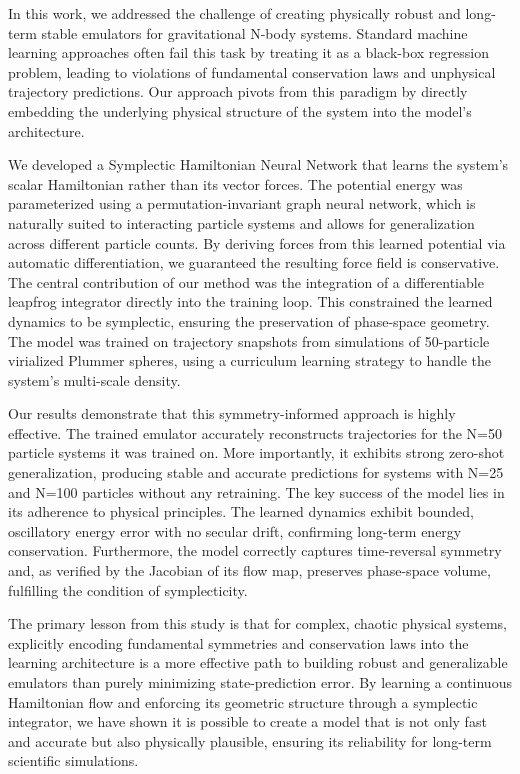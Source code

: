 \documentclass[]{article}
\begin{document}
In this work, we addressed the challenge of creating physically robust and long-term stable emulators for gravitational N-body systems. Standard machine learning approaches often fail this task by treating it as a black-box regression problem, leading to violations of fundamental conservation laws and unphysical trajectory predictions. Our approach pivots from this paradigm by directly embedding the underlying physical structure of the system into the model's architecture.

We developed a Symplectic Hamiltonian Neural Network that learns the system's scalar Hamiltonian rather than its vector forces. The potential energy was parameterized using a permutation-invariant graph neural network, which is naturally suited to interacting particle systems and allows for generalization across different particle counts. By deriving forces from this learned potential via automatic differentiation, we guaranteed the resulting force field is conservative. The central contribution of our method was the integration of a differentiable leapfrog integrator directly into the training loop. This constrained the learned dynamics to be symplectic, ensuring the preservation of phase-space geometry. The model was trained on trajectory snapshots from simulations of 50-particle virialized Plummer spheres, using a curriculum learning strategy to handle the system's multi-scale density.

Our results demonstrate that this symmetry-informed approach is highly effective. The trained emulator accurately reconstructs trajectories for the N=50 particle systems it was trained on. More importantly, it exhibits strong zero-shot generalization, producing stable and accurate predictions for systems with N=25 and N=100 particles without any retraining. The key success of the model lies in its adherence to physical principles. The learned dynamics exhibit bounded, oscillatory energy error with no secular drift, confirming long-term energy conservation. Furthermore, the model correctly captures time-reversal symmetry and, as verified by the Jacobian of its flow map, preserves phase-space volume, fulfilling the condition of symplecticity.

The primary lesson from this study is that for complex, chaotic physical systems, explicitly encoding fundamental symmetries and conservation laws into the learning architecture is a more effective path to building robust and generalizable emulators than purely minimizing state-prediction error. By learning a continuous Hamiltonian flow and enforcing its geometric structure through a symplectic integrator, we have shown it is possible to create a model that is not only fast and accurate but also physically plausible, ensuring its reliability for long-term scientific simulations.
\end{document}

